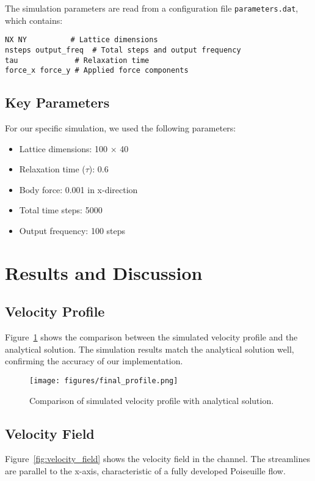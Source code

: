 \documentclass[12pt]{article}
\begin{document}
The simulation parameters are read from a configuration file \texttt{parameters.dat}, which contains:
\begin{verbatim}
NX NY          # Lattice dimensions
nsteps output_freq  # Total steps and output frequency
tau             # Relaxation time
force_x force_y # Applied force components
\end{verbatim}

\subsection{Key Parameters}
For our specific simulation, we used the following parameters:
\begin{itemize}
    \item Lattice dimensions: 100 × 40
    \item Relaxation time ($\tau$): 0.6
    \item Body force: 0.001 in x-direction
    \item Total time steps: 5000
    \item Output frequency: 100 steps
\end{itemize}

\section{Results and Discussion}

\subsection{Velocity Profile}
Figure~\ref{fig:velocity_profile} shows the comparison between the simulated velocity profile and the analytical solution. The simulation results match the analytical solution well, confirming the accuracy of our implementation.

\begin{figure}[H]
\centering
\texttt{[image: figures/final\_profile.png]}
\caption{Comparison of simulated velocity profile with analytical solution.}
\label{fig:velocity_profile}
\end{figure}

\subsection{Velocity Field}
Figure~\ref{fig:velocity_field} shows the velocity field in the channel. The streamlines are parallel to the x-axis, characteristic of a fully developed Poiseuille flow.
\end{document}
